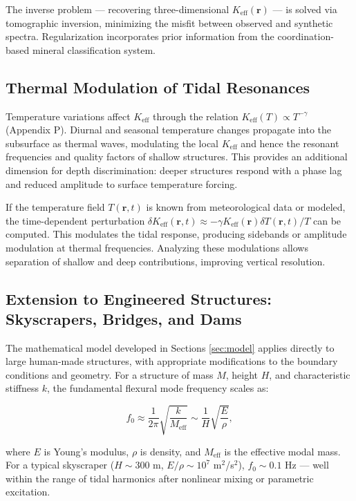 \documentclass[12pt,a4paper]{article}
\theoremstyle{remark}
\newcommand{\Keff}{K_{\mathrm{eff}}}
\begin{document}
	The inverse problem — recovering three-dimensional $\Keff(\mathbf{r})$ — is solved via tomographic inversion, minimizing the misfit between observed and synthetic spectra. Regularization incorporates prior information from the coordination-based mineral classification system.
	
	\subsection{Thermal Modulation of Tidal Resonances}
	\label{sec:thermal-modulation}
	
	Temperature variations affect $\Keff$ through the relation $\Keff(T) \propto T^{-\gamma}$ (Appendix P). Diurnal and seasonal temperature changes propagate into the subsurface as thermal waves, modulating the local $\Keff$ and hence the resonant frequencies and quality factors of shallow structures. This provides an additional dimension for depth discrimination: deeper structures respond with a phase lag and reduced amplitude to surface temperature forcing.
	
	If the temperature field $T(\mathbf{r},t)$ is known from meteorological data or modeled, the time-dependent perturbation $\delta \Keff(\mathbf{r},t) \approx -\gamma \Keff(\mathbf{r}) \delta T(\mathbf{r},t)/T$ can be computed. This modulates the tidal response, producing sidebands or amplitude modulation at thermal frequencies. Analyzing these modulations allows separation of shallow and deep contributions, improving vertical resolution.
	
	\subsection{Extension to Engineered Structures: Skyscrapers, Bridges, and Dams}
	\label{sec:structures}
	
	The mathematical model developed in Sections \ref{sec:model} applies directly to large human-made structures, with appropriate modifications to the boundary conditions and geometry. For a structure of mass \(M\), height \(H\), and characteristic stiffness \(k\), the fundamental flexural mode frequency scales as:
	
	\begin{equation}
		f_0 \approx \frac{1}{2\pi} \sqrt{\frac{k}{M_{\mathrm{eff}}}} \sim \frac{1}{H} \sqrt{\frac{E}{\rho}},
		\label{eq:structural-frequency}
	\end{equation}
	
	where \(E\) is Young's modulus, \(\rho\) is density, and \(M_{\mathrm{eff}}\) is the effective modal mass. For a typical skyscraper (\(H \sim 300\) m, \(E/\rho \sim 10^7\) m\(^2\)/s\(^2\)), \(f_0 \sim 0.1\) Hz — well within the range of tidal harmonics after nonlinear mixing or parametric excitation.
	
\end{document}

